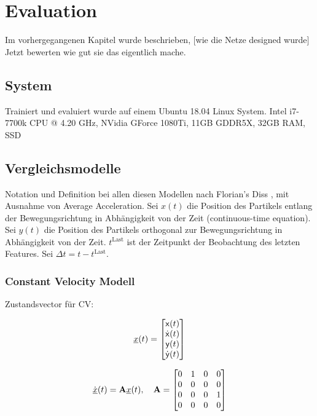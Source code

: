 \chapter{Evaluation}

Im vorhergegangenen Kapitel wurde beschrieben, [wie die Netze designed wurde]
Jetzt bewerten wie gut sie das eigentlich mache.

\section{System}

Trainiert und evaluiert wurde auf einem Ubuntu 18.04 Linux System.
Intel i7-7700k CPU @ 4.20 GHz,
NVidia GForce 1080Ti, 11GB GDDR5X,
32GB RAM,
SSD 


\section{Vergleichsmodelle}

Notation und Definition bei allen diesen Modellen nach Florian's Diss \cite{Pfaff2018}, mit Ausnahme von Average Acceleration.
Sei \(x(t)\) die Position des Partikels entlang der Bewegungsrichtung in Abhängigkeit von der Zeit
(continuous-time equation).
Sei \( y(t)\) die Position des Partikels orthogonal zur Bewegungsrichtung in Abhängigkeit von der Zeit.
\(t^{\text{Last}}\) ist der Zeitpunkt der Beobachtung des letzten Features.
Sei \(\Delta t =  t - t^{\text{Last}}\).


\subsection{Constant Velocity Modell}

Zustandsvector für CV:

 \begin{equation*} \label{eq:definitionCV}
    {\underline{x}}(t) = 
    \begin{bmatrix}
        \mathsf{x}(t) \\
        \dot{\mathsf{x}}(t) \\
        \mathsf{y}(t) \\
        \dot{\mathsf{y}}(t)
       \end{bmatrix} 
\end{equation*}

\begin{equation*} \label{eq:speedCV}
    \dot{{\underline{x}}}(t) = {{\mathbf{A}}}{\underline{x}}(t), \quad {\ensuremath{{\mathbf{A}}}} = 
    \begin{bmatrix}
        0 & 1 & 0 & 0 \\
        0 & 0 & 0 & 0 \\
        0 & 0 & 0 & 1\\
        0 & 0 & 0 & 0
    \end{bmatrix} 
\end{equation*}

